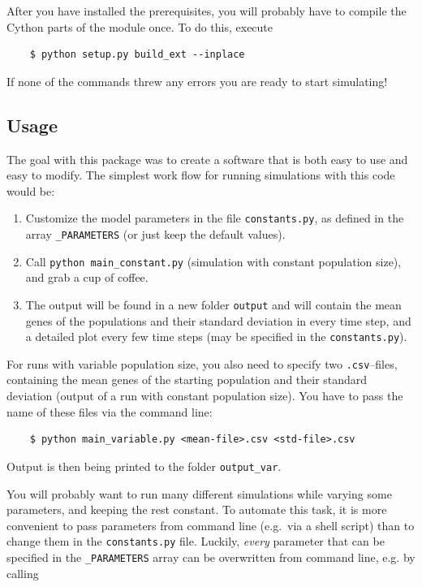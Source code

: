 \documentclass[
12pt, %
a4paper, %
headinclude,footinclude %
]{article}
\begin{document}
After you have installed the prerequisites, you will probably have to compile the Cython parts of the module once. To do this, execute

\begin{verbatim}
	$ python setup.py build_ext --inplace
\end{verbatim}

\noindent If none of the commands threw any errors you are ready to start simulating!
\subsection{Usage}

The goal with this package was to create a software that is both easy to use and easy to modify. The simplest work flow for running simulations with this code would be:

\begin{enumerate}
	\item Customize the model parameters in the file \verb|constants.py|, as defined in the array \verb|_PARAMETERS| (or just keep the default values).
	\item Call \verb|python main_constant.py| (simulation with constant population size), and grab a cup of coffee.
	\item The output will be found in a new folder \verb|output| and will contain the mean genes of the populations and their standard deviation in every time step, and a detailed plot every few time steps (may be specified in the \verb|constants.py|).
\end{enumerate}

\noindent For runs with variable population size, you also need to specify two \verb|.csv|--files, containing the mean genes of the starting population and their standard deviation (output of a run with constant population size). You have to pass the name of these files via the command line:

\begin{verbatim}
    $ python main_variable.py <mean-file>.csv <std-file>.csv
\end{verbatim}

\noindent Output is then being printed to the folder \verb|output_var|.

You will probably want to run many different simulations while varying some parameters, and keeping the rest constant. To automate this task, it is more convenient to pass parameters from command line (e.g.\ via a shell script) than to change them in the \verb|constants.py| file. Luckily, \emph{every} parameter that can be specified in the \verb|_PARAMETERS| array can be overwritten from command line, e.g. by calling
\end{document}
